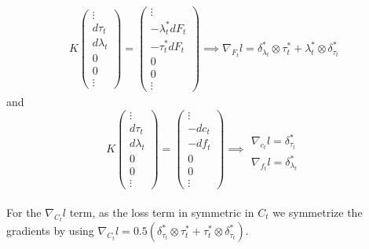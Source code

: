 \documentclass[a4paper,11pt]{article}
\begin{document}
\begin{equation}
    \begin{aligned}
        K \begin{pmatrix}
            \vdots \\
            d\tau_t
            \\d\lambda_t
            \\0
            \\0
            \\ \vdots
        \end{pmatrix} = \begin{pmatrix}\vdots            \\
            -\lambda_t^* dF_t \\
            -\tau_t^* dF_t    \\
            0                 \\
            0                 \\
            \vdots
        \end{pmatrix} \implies \nabla_{F_t}l=\delta^*_{\lambda_{t}} \otimes \tau^*_t + \lambda^*_{t} \otimes \delta^*_{\tau_{t}}
    \end{aligned}
\end{equation}
and
\begin{equation}
    K \begin{pmatrix}
        \vdots \\
        d\tau_t
        \\d\lambda_t
        \\0
        \\0
        \\ \vdots
    \end{pmatrix} = \begin{pmatrix}\vdots \\
        -dc_t  \\
        -df_t  \\
        0      \\
        0      \\
        \vdots
    \end{pmatrix} \implies
    \begin{aligned}
        \\\nabla_{c_t}l=\delta^*_{\tau_t}
        \\\nabla_{f_t}l=\delta^*_{\lambda_t}
    \end{aligned}
\end{equation}
\\For the $\nabla_{C_t}l$ term, as the loss term in symmetric in $C_t$ we symmetrize the gradients by using $\nabla_{C_t}l=0.5(\delta^*_{\tau_t} \otimes \tau^*_t + \tau^*_t \otimes \delta^*_{\tau_t} )$.
\end{document}
